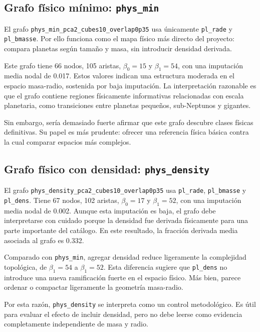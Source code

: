 \subsection*{Grafo físico mínimo: \texttt{phys\_min}}

El grafo \texttt{phys\_min\_pca2\_cubes10\_overlap0p35} usa únicamente \texttt{pl\_rade} y \texttt{pl\_bmasse}. Por ello funciona como el mapa físico más directo del proyecto: compara planetas según tamaño y masa, sin introducir densidad derivada.

Este grafo tiene 66 nodos, 105 aristas, $\beta_0=15$ y $\beta_1=54$, con una imputación media nodal de 0.017. Estos valores indican una estructura moderada en el espacio masa-radio, sostenida por baja imputación. La interpretación razonable es que el grafo contiene regiones físicamente informativas relacionadas con escala planetaria, como transiciones entre planetas pequeños, sub-Neptunos y gigantes.

Sin embargo, sería demasiado fuerte afirmar que este grafo descubre clases físicas definitivas. Su papel es más prudente: ofrecer una referencia física básica contra la cual comparar espacios más complejos.

\subsection*{Grafo físico con densidad: \texttt{phys\_density}}

El grafo \texttt{phys\_density\_pca2\_cubes10\_overlap0p35} usa \texttt{pl\_rade}, \texttt{pl\_bmasse} y \texttt{pl\_dens}. Tiene 67 nodos, 102 aristas, $\beta_0=17$ y $\beta_1=52$, con una imputación media nodal de 0.002. Aunque esta imputación es baja, el grafo debe interpretarse con cuidado porque la densidad fue derivada físicamente para una parte importante del catálogo. En este resultado, la fracción derivada media asociada al grafo es 0.332.

Comparado con \texttt{phys\_min}, agregar densidad reduce ligeramente la complejidad topológica, de $\beta_1=54$ a $\beta_1=52$. Esta diferencia sugiere que \texttt{pl\_dens} no introduce una nueva ramificación fuerte en el espacio físico. Más bien, parece ordenar o compactar ligeramente la geometría masa-radio.

Por esta razón, \texttt{phys\_density} se interpreta como un control metodológico. Es útil para evaluar el efecto de incluir densidad, pero no debe leerse como evidencia completamente independiente de masa y radio.

